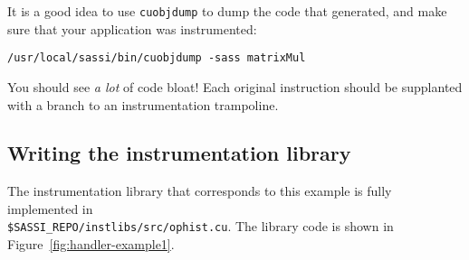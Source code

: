 It is a good idea to use \texttt{cuobjdump} to dump the code that
generated, and make sure that your application was instrumented:
\begin{lstlisting}[style=BashInputStyle]
/usr/local/sassi/bin/cuobjdump -sass matrixMul
\end{lstlisting}

You should see \emph{a lot} of code bloat!  Each original instruction
should be supplanted with a branch to an instrumentation trampoline.

\subsection{Writing the instrumentation library}

The instrumentation library that corresponds to this example is fully
implemented in \\
\texttt{\$SASSI\_REPO/instlibs/src/ophist.cu}.  The library code is shown in
Figure~\ref{fig:handler-example1}.

